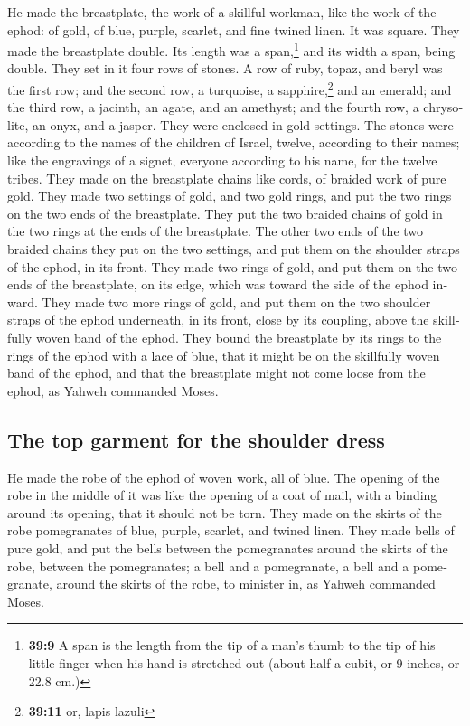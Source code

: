 \begin{paracol}{2}
\begin{otherlanguage}{english}
 He made the breastplate, the work of a skillful workman,
like the work of the ephod: of gold, of blue, purple, scarlet, and fine
twined linen.  It was square. They made the breastplate
double. Its length was a span,\footnote{\textbf{39:9} A span is the
  length from the tip of a man's thumb to the tip of his little finger
  when his hand is stretched out (about half a cubit, or 9 inches, or
  22.8 cm.)} and its width a span, being double.  They
set in it four rows of stones. A row of ruby, topaz, and beryl was the
first row;  and the second row, a turquoise, a
sapphire,\footnote{\textbf{39:11} or, lapis lazuli} and an emerald;
 and the third row, a jacinth, an agate, and an amethyst;
 and the fourth row, a chrysolite, an onyx, and a jasper.
They were enclosed in gold settings.  The stones were
according to the names of the children of Israel, twelve, according to
their names; like the engravings of a signet, everyone according to his
name, for the twelve tribes.  They made on the
breastplate chains like cords, of braided work of pure gold.
 They made two settings of gold, and two gold rings, and
put the two rings on the two ends of the breastplate. 
They put the two braided chains of gold in the two rings at the ends of
the breastplate.  The other two ends of the two braided
chains they put on the two settings, and put them on the shoulder straps
of the ephod, in its front.  They made two rings of gold,
and put them on the two ends of the breastplate, on its edge, which was
toward the side of the ephod inward.  They made two more
rings of gold, and put them on the two shoulder straps of the ephod
underneath, in its front, close by its coupling, above the skillfully
woven band of the ephod.  They bound the breastplate by
its rings to the rings of the ephod with a lace of blue, that it might
be on the skillfully woven band of the ephod, and that the breastplate
might not come loose from the ephod, as Yahweh commanded Moses.

\hypertarget{the-top-garment-for-the-shoulder-dress-1}{%
\subsection{The top garment for the shoulder
dress}\label{the-top-garment-for-the-shoulder-dress-1}}

 He made the robe of the ephod of woven work, all of
blue.  The opening of the robe in the middle of it was
like the opening of a coat of mail, with a binding around its opening,
that it should not be torn.  They made on the skirts of
the robe pomegranates of blue, purple, scarlet, and twined linen.
 They made bells of pure gold, and put the bells between
the pomegranates around the skirts of the robe, between the
pomegranates;  a bell and a pomegranate, a bell and a
pomegranate, around the skirts of the robe, to minister in, as Yahweh
commanded Moses.


\end{otherlanguage}
\end{paracol}
